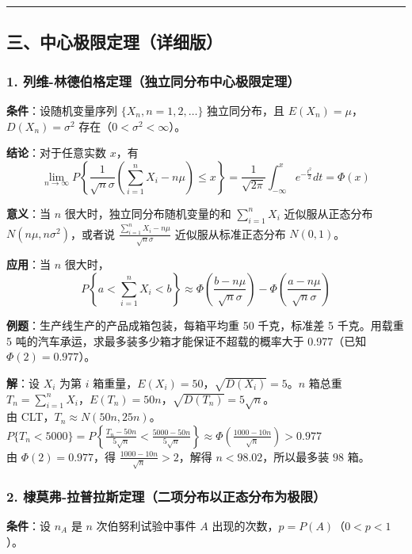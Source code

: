 \documentclass[12pt,a4paper]{ctexart}
\begin{document}
\vspace{1em}\hrule\vspace{1em}

\subsection{三、中心极限定理（详细版）}

\subsubsection{1. 列维-林德伯格定理（独立同分布中心极限定理）}
\textbf{条件}：设随机变量序列 $\{X_n, n = 1, 2, \dots\}$ 独立同分布，且 $E(X_n) = \mu$，$D(X_n) = \sigma^2$ 存在（$0 < \sigma^2 < \infty$）。

\textbf{结论}：对于任意实数 $x$，有
\[ \lim_{n \to \infty} P\left\{\frac{1}{\sqrt{n}\sigma} \left(\sum_{i=1}^n X_i - n\mu\right) \le x\right\} = \frac{1}{\sqrt{2\pi}} \int_{-\infty}^x e^{-\frac{t^2}{2}} dt = \Phi(x) \]

\textbf{意义}：当 $n$ 很大时，独立同分布随机变量的和 $\sum_{i=1}^n X_i$ 近似服从正态分布 $N(n\mu, n\sigma^2)$，或者说 $\frac{\sum_{i=1}^n X_i - n\mu}{\sqrt{n}\sigma}$ 近似服从标准正态分布 $N(0, 1)$。

\textbf{应用}：当 $n$ 很大时，
\[ P\left\{a < \sum_{i=1}^n X_i < b\right\} \approx \Phi\left(\frac{b - n\mu}{\sqrt{n}\sigma}\right) - \Phi\left(\frac{a - n\mu}{\sqrt{n}\sigma}\right) \]

\textbf{例题}：生产线生产的产品成箱包装，每箱平均重 50 千克，标准差 5 千克。用载重 5 吨的汽车承运，求最多装多少箱才能保证不超载的概率大于 0.977（已知 $\Phi(2) = 0.977$）。

\textbf{解}：设 $X_i$ 为第 $i$ 箱重量，$E(X_i)=50$，$\sqrt{D(X_i)}=5$。$n$ 箱总重 $T_n = \sum_{i=1}^n X_i$，$E(T_n)=50n$，$\sqrt{D(T_n)}=5\sqrt{n}$。\\
由 CLT，$T_n \approx N(50n, 25n)$。\\
$P\{T_n < 5000\} = P\left\{\frac{T_n - 50n}{5\sqrt{n}} < \frac{5000 - 50n}{5\sqrt{n}}\right\} \approx \Phi\left(\frac{1000 - 10n}{\sqrt{n}}\right) > 0.977$\\
由 $\Phi(2)=0.977$，得 $\frac{1000 - 10n}{\sqrt{n}} > 2$，解得 $n < 98.02$，所以最多装 $\boxed{98}$ 箱。

\subsubsection{2. 棣莫弗-拉普拉斯定理（二项分布以正态分布为极限）}
\textbf{条件}：设 $n_A$ 是 $n$ 次伯努利试验中事件 $A$ 出现的次数，$p = P(A)$（$0 < p < 1$）。
\end{document}
